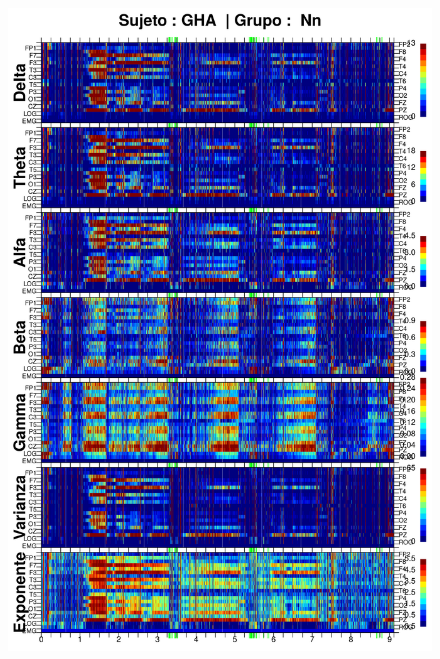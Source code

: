 \begin{figure}
\centering
\includegraphics[width=0.9\linewidth]
{./img_resultados/GH24031950SUENO_espectral_total.png} 
\end{figure}
